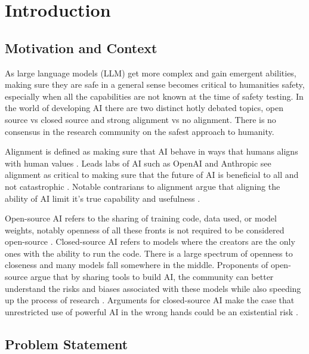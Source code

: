 \section{Introduction}

\subsection{Motivation and Context}

As large language models (LLM) get more complex and gain emergent abilities, making sure they are safe in a general sense becomes critical to humanities safety, especially when all the capabilities are not known at the time of safety testing. In the world of developing AI there are two distinct hotly debated topics, open source vs closed source and strong alignment vs no alignment. There is no consensus in the research community on the safest approach to humanity.

Alignment is defined as making sure that AI behave in ways that humans aligns with human values \citep{ji_ai_nodate}. Leads labs of AI such as OpenAI and Anthropic see alignment as critical to making sure that the future of AI is beneficial to all and not catastrophic \citep{openai_alignment, anthropic_core_views}. Notable contrarians to alignment argue that aligning the ability of AI limit it's true capability and usefulness \citep{franzen_2024_interview}.

Open-source AI refers to the sharing of training code, data used, or model weights, notably openness of all these fronts is not required to be considered open-source \citep{eiras_near_2024}. Closed-source AI refers to models where the creators are the only ones with the ability to run the code. There is a large spectrum of openness to closeness and many models fall somewhere in the middle. Proponents of open-source argue that by sharing tools to build AI, the community can better understand the risks and biases associated with these models while also speeding up the process of research \citep{groeneveld_olmo_2024}. Arguments for closed-source AI make the case that unrestricted use of powerful AI in the wrong hands could be an existential risk \citep{deepmind_frontier_2025}.

\subsection{Problem Statement}

